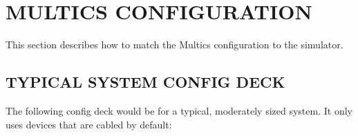 
\section[Multics Configuration]{MULTICS CONFIGURATION}

This section describes how to match the Multics configuration to the simulator.

\subsection[Typical System Config Deck]{TYPICAL SYSTEM CONFIG DECK}

The following config deck would be for a typical, moderately sized system. It only uses
devices that are cabled by default:

